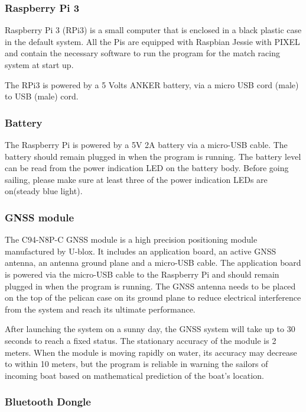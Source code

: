 \documentclass[11pt]{article}
\begin{document}
\subsubsection{Raspberry Pi 3}

Raspberry Pi 3 (RPi3) is a small computer that is enclosed in a black plastic case in the default system. All the Pis are equipped with Raspbian Jessie with PIXEL and contain the necessary software to run the program for the match racing system at start up.

The RPi3 is powered by a 5 Volts ANKER battery, via a micro USB cord (male) to USB (male) cord.

\subsubsection{Battery}

The Raspberry Pi is powered by a 5V 2A battery via a micro-USB cable. The battery should remain plugged in when the program is running. The battery level can be read from the power indication LED on the battery body. Before going sailing, please make sure at least three of the power indication LEDs are on(steady blue light). 

\subsubsection{GNSS module} \label{GNSS}

The C94-N8P-C GNSS module is a high precision positioning module manufactured by U-blox. It includes an application board, an active GNSS antenna, an antenna ground plane and a micro-USB cable. The application board is powered via the micro-USB cable to the Raspberry Pi and should remain plugged in when the program is running. The GNSS antenna needs to be placed on the top of the pelican case on its ground plane to reduce electrical interference from the system and reach its ultimate performance. 

After launching the system on a sunny day, the GNSS system will take up to 30 seconds to reach a fixed status. The stationary accuracy of the module is 2 meters. When the module is moving rapidly on water, its accuracy may decrease to within 10 meters, but the program is reliable in warning the sailors of incoming boat based on mathematical prediction of the boat's location.

\subsubsection{Bluetooth Dongle} \label{bluetooth_trans}
\end{document}
